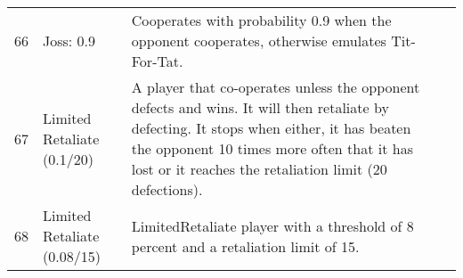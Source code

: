 \begin{table}[H]
\begin{adjustbox}{height=0.8\textwidth, width=1.1\textwidth}
\begin{tabular}{rlll}
	66   & Joss: 0.9                   & Cooperates with probability 0.9 when the opponent cooperates, otherwise
	emulates Tit-For-Tat.                                                                                                                                                                                                                                                                                                                                                                                                                                                                                                                                                                                                                                                                                                                                                                                                                                                                                                                        \\
	67   & Limited Retaliate (0.1/20)  & A player that co-operates unless the opponent defects and wins.
	It will then retaliate by defecting. It stops when either, it has beaten
	the opponent 10 times more often that it has lost or it reaches the
	retaliation limit (20 defections).                                                                                                                                                                                                                                                                                                                                                                                                                                                                                                                                                                                                                                                                                                                                                              \\
	68   & Limited Retaliate (0.08/15) & LimitedRetaliate player with a threshold of 8 percent and a
	retaliation limit of 15.                                                                                                                                                                                                                                                                                                                                                                                                                                                                                                                                                                                                                                                                                                                                                                                                                                                                                                                                 \\

\end{tabular}
\end{adjustbox}
\end{table}
